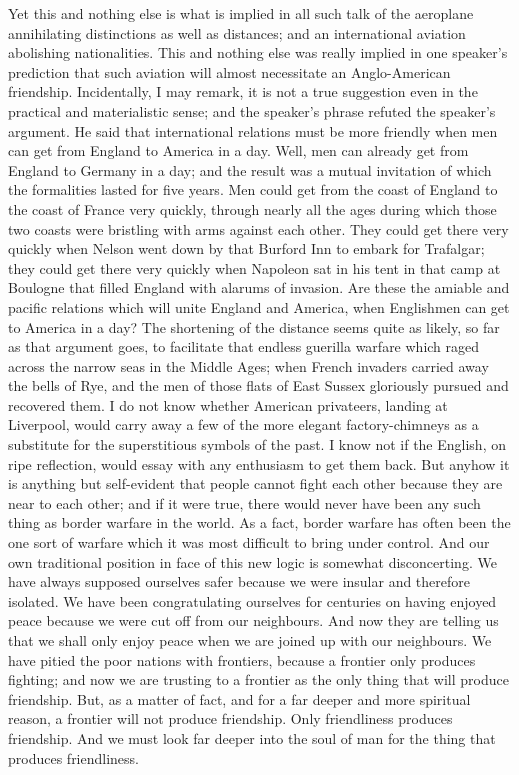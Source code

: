 \documentclass{book}
\begin{document}
Yet this and nothing else is what is implied in all such talk of the aeroplane annihilating distinctions as well as distances; and an international aviation abolishing nationalities. This and nothing else was really implied in one speaker’s prediction that such aviation will almost necessitate an Anglo-American friendship. Incidentally, I may remark, it is not a true suggestion even in the practical and materialistic sense; and the speaker’s phrase refuted the speaker’s argument. He said that international relations must be more friendly when men can get from England to America in a day. Well, men can already get from England to Germany in a day; and the result was a mutual invitation of which the formalities lasted for five years. Men could get from the coast of England to the coast of France very quickly, through nearly all the ages during which those two coasts were bristling with arms against each other. They could get there very quickly when Nelson went down by that Burford Inn to embark for Trafalgar; they could get there very quickly when Napoleon sat in his tent in that camp at Boulogne that filled England with alarums of invasion. Are these the amiable and pacific relations which will unite England and America, when Englishmen can get to America in a day? The shortening of the distance seems quite as likely, so far as that argument goes, to facilitate that endless guerilla warfare which raged across the narrow seas in the Middle Ages; when French invaders carried away the bells of Rye, and the men of those flats of East Sussex gloriously pursued and recovered them. I do not know whether American privateers, landing at Liverpool, would carry away a few of the more elegant factory-chimneys as a substitute for the superstitious symbols of the past. I know not if the English, on ripe reflection, would essay with any enthusiasm to get them back. But anyhow it is anything but self-evident that people cannot fight each other because they are near to each other; and if it were true, there would never have been any such thing as border warfare in the world. As a fact, border warfare has often been the one sort of warfare which it was most difficult to bring under control. And our own traditional position in face of this new logic is somewhat disconcerting. We have always supposed ourselves safer because we were insular and therefore isolated. We have been congratulating ourselves for centuries on having enjoyed peace because we were cut off from our neighbours. And now they are telling us that we shall only enjoy peace when we are joined up with our neighbours. We have pitied the poor nations with frontiers, because a frontier only produces fighting; and now we are trusting to a frontier as the only thing that will produce friendship. But, as a matter of fact, and for a far deeper and more spiritual reason, a frontier will not produce friendship. Only friendliness produces friendship. And we must look far deeper into the soul of man for the thing that produces friendliness.
\end{document}
